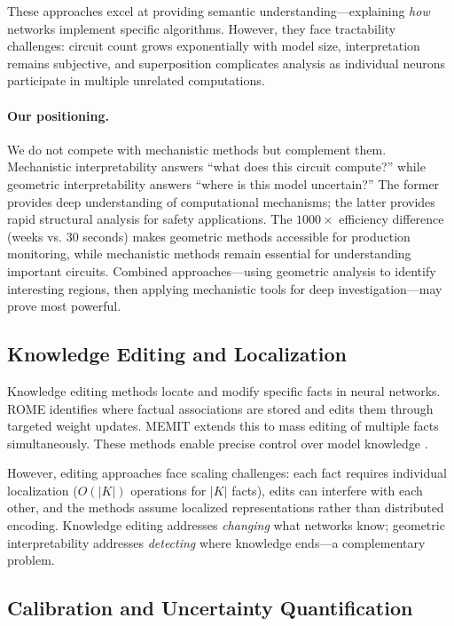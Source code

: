 \documentclass[11pt]{article}
\begin{document}
These approaches excel at providing semantic understanding---explaining \textit{how} networks implement specific algorithms. However, they face tractability challenges: circuit count grows exponentially with model size, interpretation remains subjective, and superposition \citep{elhage2022superposition} complicates analysis as individual neurons participate in multiple unrelated computations.

\paragraph{Our positioning.} We do not compete with mechanistic methods but complement them. Mechanistic interpretability answers ``what does this circuit compute?'' while geometric interpretability answers ``where is this model uncertain?'' The former provides deep understanding of computational mechanisms; the latter provides rapid structural analysis for safety applications. The $1000\times$ efficiency difference (weeks vs. 30 seconds) makes geometric methods accessible for production monitoring, while mechanistic methods remain essential for understanding important circuits. Combined approaches---using geometric analysis to identify interesting regions, then applying mechanistic tools for deep investigation---may prove most powerful.

\subsection{Knowledge Editing and Localization}

Knowledge editing methods locate and modify specific facts in neural networks. ROME \citep{meng2022locating} identifies where factual associations are stored and edits them through targeted weight updates. MEMIT \citep{meng2023mass} extends this to mass editing of multiple facts simultaneously. These methods enable precise control over model knowledge \citep{mitchell2022fast}.

However, editing approaches face scaling challenges: each fact requires individual localization ($O(|K|)$ operations for $|K|$ facts), edits can interfere with each other, and the methods assume localized representations rather than distributed encoding. Knowledge editing addresses \textit{changing} what networks know; geometric interpretability addresses \textit{detecting} where knowledge ends---a complementary problem.

\subsection{Calibration and Uncertainty Quantification}
\end{document}
